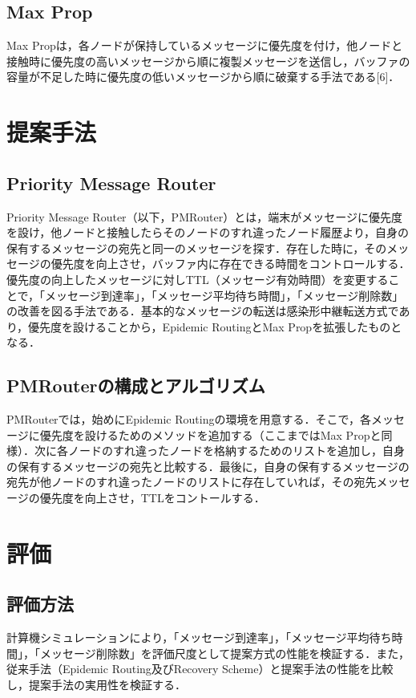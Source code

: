 \documentclass[11pt]{icsthesis}
\begin{document}
\section{Max Prop}
Max Propは，各ノードが保持しているメッセージに優先度を付け，他ノードと接触時に優先度の高いメッセージから順に複製メッセージを送信し，バッファの容量が不足した時に優先度の低いメッセージから順に破棄する手法である[6]．

\chapter{提案手法}
\section{Priority Message Router}
Priority Message Router（以下，PMRouter）とは，端末がメッセージに優先度を設け，他ノードと接触したらそのノードのすれ違ったノード履歴より，自身の保有するメッセージの宛先と同一のメッセージを探す．存在した時に，そのメッセージの優先度を向上させ，バッファ内に存在できる時間をコントロールする．優先度の向上したメッセージに対しTTL（メッセージ有効時間）を変更することで，「メッセージ到達率」，「メッセージ平均待ち時間」，「メッセージ削除数」の改善を図る手法である．基本的なメッセージの転送は感染形中継転送方式であり，優先度を設けることから，Epidemic RoutingとMax Propを拡張したものとなる．

\section{PMRouterの構成とアルゴリズム}
PMRouterでは，始めにEpidemic Routingの環境を用意する．そこで，各メッセージに優先度を設けるためのメソッドを追加する（ここまではMax Propと同様）．次に各ノードのすれ違ったノードを格納するためのリストを追加し，自身の保有するメッセージの宛先と比較する．最後に，自身の保有するメッセージの宛先が他ノードのすれ違ったノードのリストに存在していれば，その宛先メッセージの優先度を向上させ，TTLをコントールする．

\chapter{評価}
\section{評価方法}
計算機シミュレーションにより，「メッセージ到達率」，「メッセージ平均待ち時間」，「メッセージ削除数」を評価尺度として提案方式の性能を検証する．また，従来手法（Epidemic Routing及びRecovery Scheme）と提案手法の性能を比較し，提案手法の実用性を検証する．
\end{document}
